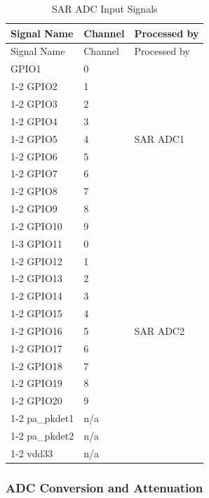 \documentclass[main\_\_EN.tex]{subfiles}
\begin{document}
\begin{longtable}{ |p{3cm}|p{3cm}|p{3cm}| }
    \caption{SAR ADC Input Signals}
    \label{table:adc inputs}
    \\\hline
    \rowcolor{lightgray}
    Signal Name  & Channel  & Processed by \\\hline
    \endfirsthead
    \hline
    \rowcolor{lightgray}
    Signal Name  & Channel  & Processed by \\\hline
    \endhead
    \hline
    \endfoot
    GPIO1       &  0  & \multirow{9}{*}{SAR ADC1} \\ \cline{1-2}
    GPIO2       &  1  & \\ \cline{1-2}
    GPIO3       &  2  & \\ \cline{1-2}
    GPIO4       &  3  & \\ \cline{1-2}
    GPIO5       &  4  & \\ \cline{1-2}
    GPIO6       &  5  & \\ \cline{1-2}
    GPIO7       &  6  & \\ \cline{1-2}
    GPIO8       &  7  & \\ \cline{1-2}
    GPIO9       &  8  & \\ \cline{1-2}
    GPIO10      &  9  & \multirow{13}{*}{SAR ADC2} \\ \cline{1-3}
    GPIO11      &  0  & \\ \cline{1-2}
    GPIO12      &  1  & \\ \cline{1-2}
    GPIO13      &  2  & \\ \cline{1-2}
    GPIO14      &  3  & \\ \cline{1-2}
    GPIO15      &  4  & \\ \cline{1-2}
    GPIO16      &  5  & \\ \cline{1-2}
    GPIO17      &  6  & \\ \cline{1-2}
    GPIO18      &  7  & \\ \cline{1-2}
    GPIO19      &  8  & \\ \cline{1-2}
    GPIO20      &  9  & \\ \cline{1-2}
    pa\_pkdet1    &  n/a  & \\ \cline{1-2}
    pa\_pkdet2    &  n/a  & \\ \cline{1-2}
    vdd33         &  n/a  &
\end{longtable}

\subsubsection{ADC Conversion and Attenuation}
\end{document}
